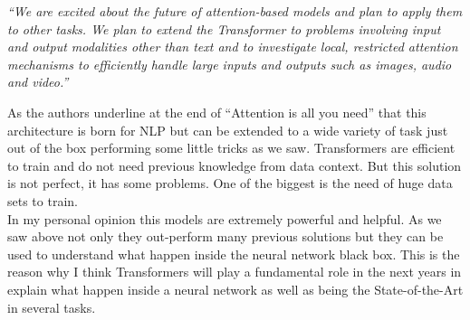 \documentclass[11pt]{article}
\begin{document}
\begin{center}
\noindent \emph{``We are excited about the future of attention-based models and plan to apply them to other tasks. We plan to extend the Transformer to problems involving input and output modalities other than text and to investigate local, restricted attention mechanisms to efficiently handle large inputs and outputs such as images, audio and video.'' \cite{att}}
\end{center} 

\noindent As the authors underline at the end of  ``Attention is all you need'' that this architecture is born for NLP but can be extended to a wide variety of task just out of the box performing some little tricks as we saw. Transformers are efficient to train and do not need previous knowledge from data context. But this solution is not perfect, it has some problems. One of the biggest is the need of huge data sets to train. \\

In my personal opinion this models are extremely powerful and helpful. As we saw above not only they out-perform many previous solutions but they can be used to understand what happen inside the neural network black box. This is the reason why I think Transformers will play a fundamental role in the next years in explain what happen inside a neural network as well as being the State-of-the-Art in several tasks. \\

\newpage
\end{document}
